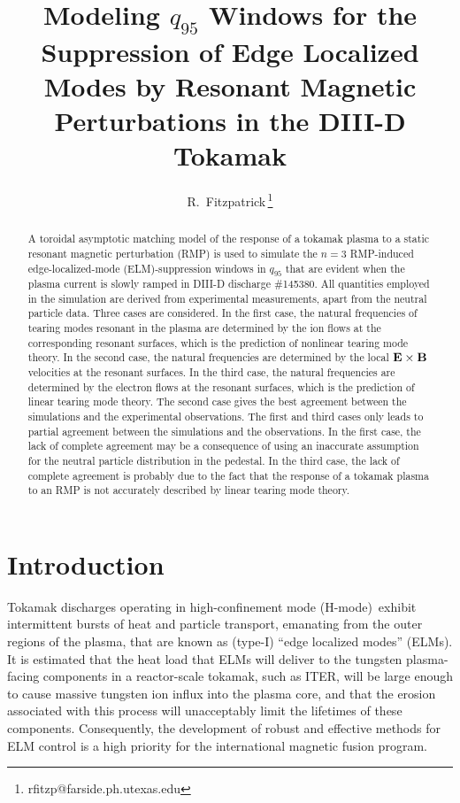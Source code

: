 \documentclass[12pt,prb,aps]{revtex4-1}
\begin{document}
\title {Modeling $q_{95}$ Windows for the Suppression of Edge Localized Modes by Resonant Magnetic Perturbations in the DIII-D Tokamak}

\author{R.~Fitzpatrick\,\footnote{rfitzp@farside.ph.utexas.edu}}

\begin{abstract}
A toroidal asymptotic matching model of the response of a tokamak plasma to a static resonant magnetic perturbation (RMP) is used to simulate the $n=3$ RMP-induced 
edge-localized-mode (ELM)-suppression
windows in $q_{95}$ that are evident when the plasma current is slowly ramped in DIII-D discharge \#145380. All quantities employed in the simulation are
derived from experimental measurements, apart from the neutral particle data. 
Three cases are considered.
In the first case, the natural frequencies of tearing modes resonant in the plasma are 
determined by the ion flows at the corresponding resonant surfaces, which is the prediction of nonlinear tearing mode theory.
In the second case, the natural frequencies are 
determined by the local ${\bf E}\times {\bf B}$ velocities at the resonant surfaces.
 In the third case, the natural frequencies   are 
determined by the electron flows at the  resonant surfaces, which is the prediction of linear tearing mode theory.
The second case gives  the best agreement between the simulations and the  experimental observations.    The first and third cases only leads to partial agreement between  the  simulations and the  observations. In the first case, the lack of complete agreement
may be a consequence of using an inaccurate assumption for the neutral particle distribution in the pedestal.  In the third case, the lack of complete agreement is probably
due to the fact that the response of a tokamak plasma to an RMP is not accurately described by linear tearing mode theory.
\end{abstract}
 
\maketitle

\section{Introduction}
Tokamak discharges operating in high-confinement mode (H-mode)\,\cite{wagner} exhibit intermittent bursts of heat and particle transport, 
emanating from the outer regions of the plasma, that are known as  (type-I) ``edge localized modes'' (ELMs).\cite{zohm}
It is estimated that the heat load that ELMs
will deliver to the tungsten plasma-facing components in a reactor-scale tokamak, such as ITER, will be large enough to cause
massive tungsten ion influx into the plasma core, and that the erosion associated with this process will 
unacceptably limit the lifetimes of these components.\cite{loarte} Consequently, the development of robust and effective
methods for ELM control is a high priority for the international magnetic fusion program. 
\end{document}
